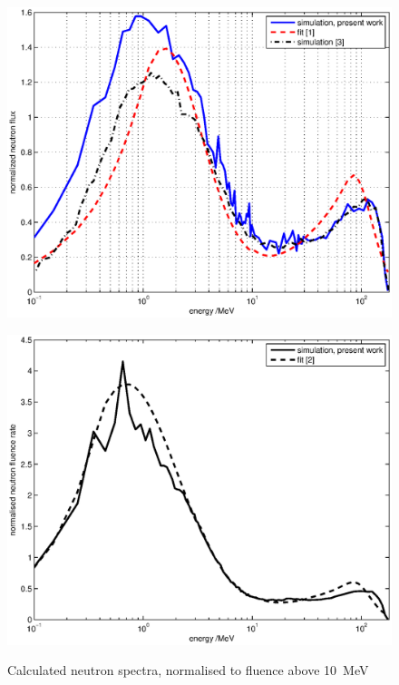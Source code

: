 \documentclass[peerreviewca,11pt,a4paper]{IEEEtran}
\let\MYoriglatexcaption\caption
\renewcommand{\caption}[2][\relax]{\MYoriglatexcaption[#2]{#2}}
\begin{document}
\begin{figure}[t]
    \begin{minipage}{\columnwidth}
        \centering
        \includegraphics[width=0.9\columnwidth]{SUPNormalisedRADECS.eps}
        \label{fig:LethargyplotSUP}
    \end{minipage}
    \begin{minipage}{\columnwidth}
        \centering
        \includegraphics[width=0.9\columnwidth]{CUPcomparedProkofiev2014NormalisedRADECS.eps}
        \label{fig:LethargyplotCUP}
    \end{minipage}
	\caption{
        Calculated neutron spectra, normalised to fluence above \SI{10}{\MeV} }
	\label{fig:Lethargyplots}
\end{figure}
\end{document}
